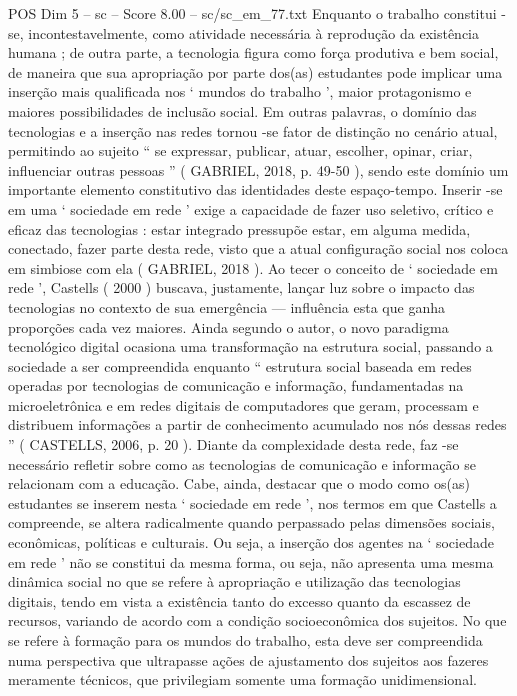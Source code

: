 \begin{textsample}{POS Dim 5 – sc – Score 8.00 – sc/sc\_em\_77.txt}
Enquanto o trabalho constitui -se, incontestavelmente, como atividade necessária à reprodução da existência humana ; de outra parte, a tecnologia figura como força produtiva e bem social, de maneira que sua apropriação por parte dos(as) estudantes pode implicar uma inserção mais qualificada nos ‘ mundos do trabalho ’, maior protagonismo e maiores possibilidades de inclusão social.
Em outras palavras, o domínio das tecnologias e a inserção nas redes tornou -se fator de distinção no cenário atual, permitindo ao sujeito “ se expressar, publicar, atuar, escolher, opinar, criar, influenciar outras pessoas ” ( GABRIEL, 2018, p. 49-50 ), sendo este domínio um importante elemento constitutivo das identidades deste espaço-tempo.
Inserir -se em uma ‘ sociedade em rede ’ exige a capacidade de fazer uso seletivo, crítico e eficaz das tecnologias : estar integrado pressupõe estar, em alguma medida, conectado, fazer parte desta rede, visto que a atual configuração social nos coloca em simbiose com ela ( GABRIEL, 2018 ).
Ao tecer o conceito de ‘ sociedade em rede ’, Castells ( 2000 ) buscava, justamente, lançar luz sobre o impacto das tecnologias no contexto de sua emergência — influência esta que ganha proporções cada vez maiores.
Ainda segundo o autor, o novo paradigma tecnológico digital ocasiona uma transformação na estrutura social, passando a sociedade a ser compreendida enquanto “ estrutura social baseada em redes operadas por tecnologias de comunicação e informação, fundamentadas na microeletrônica e em redes digitais de computadores que geram, processam e distribuem informações a partir de conhecimento acumulado nos nós dessas redes ” ( CASTELLS, 2006, p. 20 ).
Diante da complexidade desta rede, faz -se necessário refletir sobre como as tecnologias de comunicação e informação se relacionam com a educação.
Cabe, ainda, destacar que o modo como os(as) estudantes se inserem nesta ‘ sociedade em rede ’, nos termos em que Castells a compreende, se altera radicalmente quando perpassado pelas dimensões sociais, econômicas, políticas e culturais.
Ou seja, a inserção dos agentes na ‘ sociedade em rede ’ não se constitui da mesma forma, ou seja, não apresenta uma mesma dinâmica social no que se refere à apropriação e utilização das tecnologias digitais, tendo em vista a existência tanto do excesso quanto da escassez de recursos, variando de acordo com a condição socioeconômica dos sujeitos.
No que se refere à formação para os mundos do trabalho, esta deve ser compreendida numa perspectiva que ultrapasse ações de ajustamento dos sujeitos aos fazeres meramente técnicos, que privilegiam somente uma formação unidimensional.

\end{textsample}
